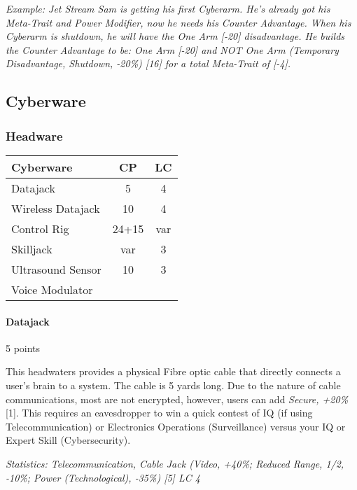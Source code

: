\begin{multicols*}{3}
	\textit{\textcolor{OliveGreen}{Example: Jet Stream Sam is getting his first Cyberarm. He's already got his Meta-Trait and Power Modifier, now he needs his Counter Advantage. When his Cyberarm is shutdown, he will have the One Arm [-20] disadvantage. He builds the Counter Advantage to be: One Arm [-20] and NOT One Arm (Temporary Disadvantage, Shutdown, -20\%) [16] for a total Meta-Trait of [-4].}}
	
	\subsection{Cyberware}
	
	\subsubsection{Headware}
	
	\begin{center}
		\begin{tabularx}{0.32\textwidth}{|X|c|c|}
			\hline
			Cyberware & CP & LC\\
			\hline
			\hline
			Datajack & 5 & 4\\
			Wireless Datajack & 10 & 4\\
			Control Rig & 24+15 & var\\
			Skilljack & var & 3 \\
			Ultrasound Sensor & 10 & 3 \\
			Voice Modulator & & \\
			\hline
		\end{tabularx}
	\end{center}
	
	\paragraph{Datajack}
	\begin{flushright}
		5 points
	\end{flushright}
	
	This headwaters provides a physical Fibre optic cable that directly connects a user's brain to a system. The cable is 5 yards long. Due to the nature of cable communications, most are not encrypted, however, users can add \textit{Secure, +20\%} [1]. This requires an eavesdropper to win a quick contest of IQ (if using Telecommunication) or Electronics Operations (Surveillance) versus your IQ or Expert Skill (Cybersecurity).
	
	\textit{\textcolor{OliveGreen}{Statistics: Telecommunication, Cable Jack (Video, +40\%; Reduced Range, 1/2, -10\%; Power (Technological), -35\%) [5] LC 4}}
	

\end{multicols*}
